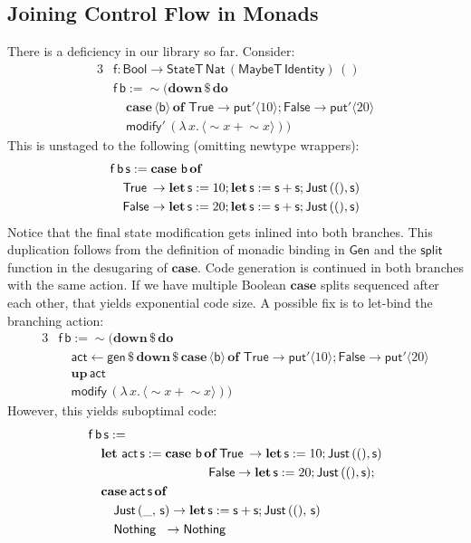 \documentclass[acmsmall]{acmart}
\newcommand{\mit}[1]{{\mathsf{#1}}}
\newcommand{\msf}[1]{{\mathsf{#1}}}
\newcommand{\mbf}[1]{{\mathbf{#1}}}
\newcommand{\bs}[1]{\boldsymbol{#1}}
\newcommand{\mdo}{\mbf{do}\,}
\newcommand{\ind}{\hspace{1em}}
\newcommand{\of}{\mbf{of}\,}
\newcommand{\letdef}{\mbf{let\,}}
\newcommand{\vb}{\mathsf{b}}
\newcommand{\vf}{\mathsf{f}}
\newcommand{\vs}{\mathsf{s}}
\newcommand{\Bool}{\msf{Bool}}
\newcommand{\fro}{\leftarrow}
\newcommand{\case}{\mbf{case\,}}
\newcommand{\spl}{{\bs{\sim}}}
\newcommand{\ql}{{\bs{\langle}}}
\newcommand{\qr}{{\bs{\rangle}}}
\newcommand{\True}{\msf{True}}
\newcommand{\False}{\msf{False}}
\newcommand{\Nat}{\msf{Nat}}
\newcommand{\MaybeT}{\msf{MaybeT}}
\newcommand{\Nothing}{\msf{Nothing}}
\newcommand{\Just}{\msf{Just}}
\theoremstyle{remark}
\newcommand{\mup}{\mbf{up}}
\newcommand{\mdown}{\mbf{down}}
\newcommand{\Gen}{\msf{Gen}}
\newcommand{\gen}{\mit{gen}}
\newcommand{\qt}[1]{\ql#1\qr}
\newcommand{\StateT}{\msf{StateT}}
\newcommand{\Identity}{\msf{Identity}}
\newcommand{\dlr}{\,\$\,}
\newcommand{\modify}{\mit{modify}}
\newcommand{\mput}{\mit{put}}
\begin{document}
\subsection{Joining Control Flow in Monads}\label{sec:joining-control-flow-in-monads}

There is a deficiency in our library so far. Consider:
\begin{alignat*}{3}
  & \vf : \Bool \to \StateT\,\Nat\,(\MaybeT\,\Identity)\,()\\
  & \vf\,\vb := \spl(\mdown \dlr \mdo \\
  & \ind \case \qt{\vb}\,\of\,\True\to \mput' \qt{10}; \False \to \mput' \qt{20}\\
  & \ind\modify'\,(\lambda\,x.\,\qt{\spl x + \spl x}))
\end{alignat*}
This is unstaged to the following (omitting newtype wrappers):
\begin{alignat*}{3}
  & \vf\,\vb\,\vs := \case\,\vb\,\of \\
  & \ind \True\hspace{0.2em} \to \letdef \vs := 10; \letdef \vs := \vs + \vs; \Just\,((),\vs)\\
  & \ind \False \to \letdef \vs := 20; \letdef \vs := \vs + \vs; \Just\,((),\vs)
\end{alignat*}
Notice that the final state modification gets inlined into both branches. This
duplication follows from the definition of monadic binding in $\Gen$ and the
$\mit{split}$ function in the desugaring of $\mbf{case}$. Code generation is
continued in both branches with the same action. If we have multiple Boolean
$\mbf{case}$ splits sequenced after each other, that yields exponential code
size. A possible fix is to let-bind the branching action:
\begin{alignat*}{3}
  & \vf\,\vb := \spl(\mdown \dlr \mdo \\
  & \ind \msf{act} \fro \gen \dlr \mdown \dlr \case \qt{\vb}\,\of\,\True\to \mput' \qt{10}; \False \to \mput' \qt{20} \\
  & \ind \mup\,\msf{act} \\
  & \ind\modify\,(\lambda\,x.\,\qt{\spl x + \spl x}))
\end{alignat*}
However, this yields suboptimal code:
\begin{alignat*}{3}
  & \vf\,\vb\,\vs :=\\
  & \ind \letdef\,\msf{act}\,\vs := \case\,\vb\,\of \True\hspace{0.2em}\to \letdef \vs := 10; \Just\,((), \vs)\\
  & \ind\hspace{8.5em}                               \False \to \letdef \vs := 20; \Just\,((), \vs);\\
  & \ind \case \msf{act}\,\vs\,\of\\
  & \ind\ind \Just\,(\_,\,\vs) \to \letdef \vs := \vs + \vs; \Just\,((),\,\vs)\\
  & \ind\ind \Nothing\hspace{0.6em} \to \Nothing
\end{alignat*}
\end{document}
